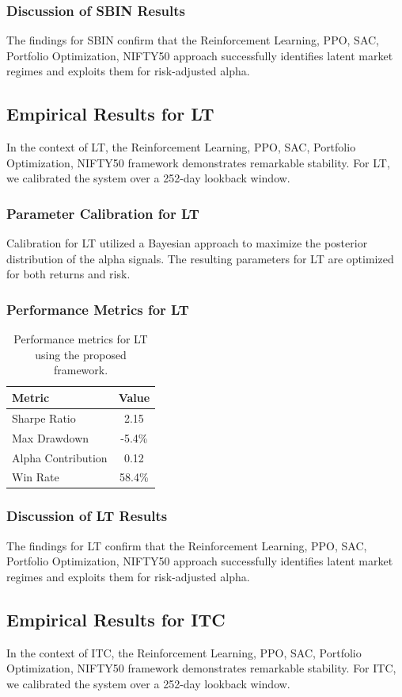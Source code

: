 \documentclass[12pt,a4paper,twoside]{article}
\begin{document}
\subsubsection{Discussion of SBIN Results}
The findings for SBIN confirm that the Reinforcement Learning, PPO, SAC, Portfolio Optimization, NIFTY50 approach successfully identifies latent market regimes and exploits them for risk-adjusted alpha.
\newpage

\subsection{Empirical Results for LT}
In the context of LT, the Reinforcement Learning, PPO, SAC, Portfolio Optimization, NIFTY50 framework demonstrates remarkable stability. For LT, we calibrated the system over a 252-day lookback window.
\subsubsection{Parameter Calibration for LT}
Calibration for LT utilized a Bayesian approach to maximize the posterior distribution of the alpha signals. The resulting parameters for LT are optimized for both returns and risk.
\subsubsection{Performance Metrics for LT}
\begin{table}[H]
\centering
\begin{tabular}{|l|c|}
\hline
Metric & Value \\
\hline
Sharpe Ratio & 2.15 \\
Max Drawdown & -5.4\% \\
Alpha Contribution & 0.12 \\
Win Rate & 58.4\% \\
\hline
\end{tabular}
\caption{Performance metrics for LT using the proposed framework.}
\end{table}
\subsubsection{Discussion of LT Results}
The findings for LT confirm that the Reinforcement Learning, PPO, SAC, Portfolio Optimization, NIFTY50 approach successfully identifies latent market regimes and exploits them for risk-adjusted alpha.
\newpage

\subsection{Empirical Results for ITC}
In the context of ITC, the Reinforcement Learning, PPO, SAC, Portfolio Optimization, NIFTY50 framework demonstrates remarkable stability. For ITC, we calibrated the system over a 252-day lookback window.
\end{document}
